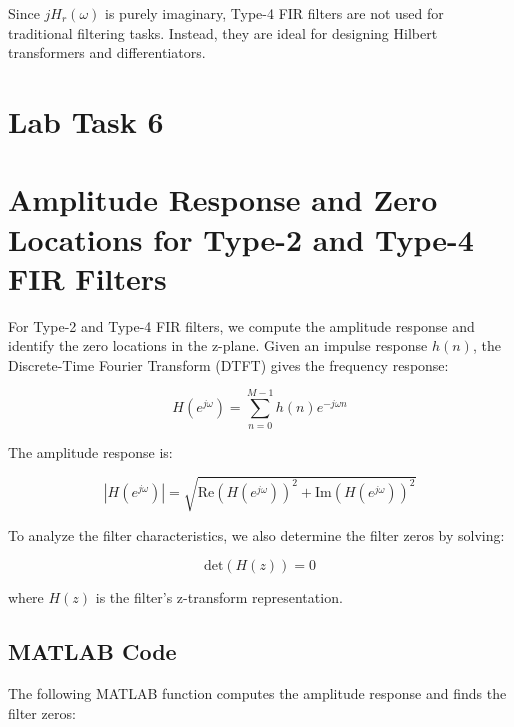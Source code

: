 \documentclass[a4paper,12pt]{article}
\begin{document}
Since \( jH_r(\omega) \) is purely imaginary, Type-4 FIR filters are not used for traditional filtering tasks. Instead, they are ideal for designing Hilbert transformers and differentiators.
\section*{Lab Task 6}
\section{Amplitude Response and Zero Locations for Type-2 and Type-4 FIR Filters}

For Type-2 and Type-4 FIR filters, we compute the amplitude response and identify the zero locations in the z-plane. Given an impulse response \( h(n) \), the Discrete-Time Fourier Transform (DTFT) gives the frequency response:

\[
H(e^{j\omega}) = \sum_{n=0}^{M-1} h(n) e^{-j\omega n}
\]

The amplitude response is:

\[
|H(e^{j\omega})| = \sqrt{\text{Re}(H(e^{j\omega}))^2 + \text{Im}(H(e^{j\omega}))^2}
\]

To analyze the filter characteristics, we also determine the filter zeros by solving:

\[
\text{det}(H(z)) = 0
\]

where \( H(z) \) is the filter's z-transform representation.

\subsection{MATLAB Code}

The following MATLAB function computes the amplitude response and finds the filter zeros:
\end{document}
